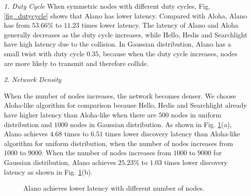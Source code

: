 \emph{1. Duty Cycle}
When symmetric nodes with different duty cycles, Fig. \ref{fig_dutycycle} shows that Alano has lower latency. Compared with Aloha, Alano has from $53.66\%$ to $11.23$ times lower latency. The latency of Alano and Aloha generally decreases as the duty cycle increases, while Hello, Hedis and Searchlight have high latency due to the collision. In Gaussian distribution, Alano has a small twist with duty cycle $0.35$, because when the duty cycle increases, nodes are more likely to transmit and therefore collide.


\emph{2. Network Density}

When the number of nodes increases, the network becomes denser. We choose Aloha-like algorithm for comparison because Hello, Hedis and Searchlight already have higher latency than Aloha-like when there are $500$ nodes in uniform distribution and $1000$ nodes in Gaussian distribution.
As shown in Fig. \ref{fig_node}(a), Alano achieves $4.68$ times to $6.51$ times lower discovery latency than Aloha-like algorithm for uniform distribution, when the number of nodes increases from $1000$ to $9000$.
When the number of nodes increases from $1000$ to $9000$ for Gaussian distribution, Alano achieves $25.23\%$ to $1.03$ times lower discovery latency as shown in Fig. \ref{fig_node}(b).  

\begin{figure}[!h]
\centering
{}
\hspace{0.01in}
\caption{Alano achieves lower latency with different number of nodes.}
\label{fig_node}
\end{figure}


